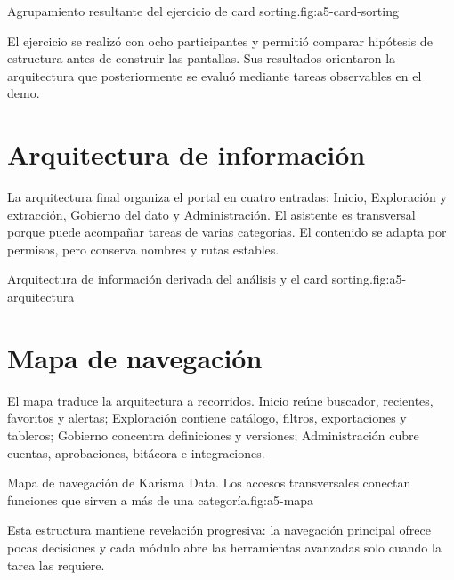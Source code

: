 {Agrupamiento resultante del ejercicio de card sorting.}{fig:a5-card-sorting}

El ejercicio se realizó con ocho participantes y permitió comparar hipótesis de estructura antes
de construir las pantallas. Sus resultados orientaron la arquitectura que posteriormente se
evaluó mediante tareas observables en el demo.

\section{Arquitectura de información}

La arquitectura final organiza el portal en cuatro entradas: Inicio, Exploración y extracción,
Gobierno del dato y Administración. El asistente es transversal porque puede acompañar tareas de
varias categorías. El contenido se adapta por permisos, pero conserva nombres y rutas estables.

{Arquitectura de información derivada del análisis y el card sorting.}{fig:a5-arquitectura}

\section{Mapa de navegación}

El mapa traduce la arquitectura a recorridos. Inicio reúne buscador, recientes, favoritos y
alertas; Exploración contiene catálogo, filtros, exportaciones y tableros; Gobierno concentra
definiciones y versiones; Administración cubre cuentas, aprobaciones, bitácora e integraciones.

{Mapa de navegación de Karisma Data. Los accesos transversales conectan funciones que sirven a más de una categoría.}{fig:a5-mapa}

Esta estructura mantiene revelación progresiva: la navegación principal ofrece pocas decisiones y
cada módulo abre las herramientas avanzadas solo cuando la tarea las requiere.
